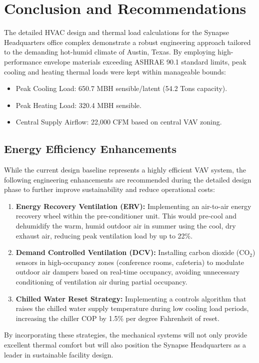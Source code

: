 \section{Conclusion and Recommendations}
\label{sec:conclusion}

The detailed HVAC design and thermal load calculations for the Synapse Headquarters office complex demonstrate a robust engineering approach tailored to the demanding hot-humid climate of Austin, Texas. By employing high-performance envelope materials exceeding ASHRAE 90.1 standard limits, peak cooling and heating thermal loads were kept within manageable bounds:
\begin{itemize}
  \item Peak Cooling Load: 650.7 MBH sensible/latent (54.2 Tons capacity).
  \item Peak Heating Load: 320.4 MBH sensible.
  \item Central Supply Airflow: 22,000 CFM based on central VAV zoning.
\end{itemize}

\subsection{Energy Efficiency Enhancements}
While the current design baseline represents a highly efficient VAV system, the following engineering enhancements are recommended during the detailed design phase to further improve sustainability and reduce operational costs:
\begin{enumerate}
  \item \textbf{Energy Recovery Ventilation (ERV):} Implementing an air-to-air energy recovery wheel within the pre-conditioner unit. This would pre-cool and dehumidify the warm, humid outdoor air in summer using the cool, dry exhaust air, reducing peak ventilation load by up to 22\%.
  \item \textbf{Demand Controlled Ventilation (DCV):} Installing carbon dioxide (CO$_{2}$) sensors in high-occupancy zones (conference rooms, cafeteria) to modulate outdoor air dampers based on real-time occupancy, avoiding unnecessary conditioning of ventilation air during partial occupancy.
  \item \textbf{Chilled Water Reset Strategy:} Implementing a controls algorithm that raises the chilled water supply temperature during low cooling load periods, increasing the chiller COP by 1.5\% per degree Fahrenheit of reset.
\end{enumerate}

By incorporating these strategies, the mechanical systems will not only provide excellent thermal comfort but will also position the Synapse Headquarters as a leader in sustainable facility design.
